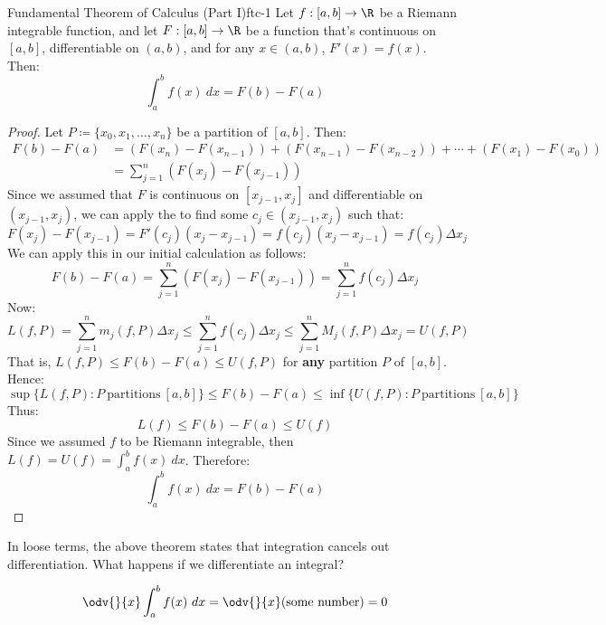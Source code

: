 \begin{thmbox}{Fundamental Theorem of Calculus (Part I)}{ftc-1}
    Let $f : [a,b] \to \R$ be a Riemann integrable function, and let $F : [a,b] \to \R$ be a function that's continuous on $[a,b]$, differentiable on $(a,b)$, and for any $x \in (a,b)$, $F\prime(x) = f(x)$. Then:
    \[ \int_a^b f(x)\ dx = F(b) - F(a) \]
    \tcblower
    \begin{proof}
        Let $P \coloneq \{x_0, x_1, \ldots, x_n\}$ be a partition of $[a,b]$. Then:
        \begin{align*}
            F(b) - F(a)
            &= \left( F(x_n) - F(x_{n-1}) \right) + \left( F(x_{n-1}) - F(x_{n-2}) \right) + \cdots + \left( F(x_1) - F(x_0) \right) \\
            &= \sum_{j=1}^{n} \left( F(x_j) - F(x_{j-1}) \right)
        \end{align*}
        Since we assumed that $F$ is continuous on $[x_{j-1}, x_j]$ and differentiable on $(x_{j-1}, x_j)$, we can apply the  to find some $c_j \in (x_{j-1}, x_j)$ such that:
        \[ F(x_j) - F(x_{j-1}) = F\prime(c_j) (x_j - x_{j-1}) = f(c_j)(x_j - x_{j-1}) = f(c_j) \Delta x_j \]
        We can apply this in our initial calculation as follows:
        \[ F(b) - F(a) = \sum_{j=1}^{n} \left( F(x_j) - F(x_{j-1}) \right) = \sum_{j=1}^{n} f(c_j) \Delta x_j \]
        Now:
        \[ L(f,P) = \sum_{j=1}^{n} m_j(f, P) \Delta x_j \leq \sum_{j=1}^{n} f(c_j) \Delta x_j \leq \sum_{j=1}^{n} M_j(f, P) \Delta x_j = U(f,P) \]
        That is, $L(f,P) \leq F(b) - F(a) \leq U(f,P)$ for \textbf{any} partition $P$ of $[a,b]$. Hence:
        \[ \sup\{L(f,P) : P\ \text{partitions}\ [a,b]\} \leq F(b) - F(a) \leq \inf\{U(f,P) : P\ \text{partitions}\ [a,b]\} \]
        Thus:
        \[ L(f) \leq F(b) - F(a) \leq U(f) \]
        Since we assumed $f$ to be Riemann integrable, then $L(f) = U(f) = \int_a^b f(x)\ dx$. Therefore:
        \[ \int_a^b f(x)\ dx = F(b) - F(a) \]
    \end{proof}
\end{thmbox}

In loose terms, the above theorem states that integration cancels out differentiation. What happens if we differentiate an integral?

\[ \odv{}{x} \int_a^b f(x)\ dx = \odv{}{x} (\text{some number}) = 0 \]

